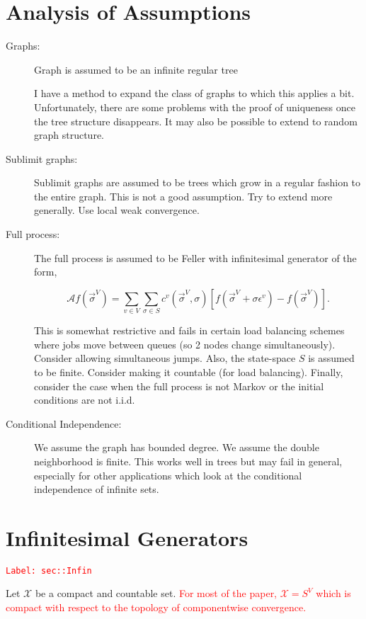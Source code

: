 \documentclass[12pt]{article}
\newcommand{\mc}{\mathcal}
\newcommand{\ep}{\epsilon}
\newcommand{\tr}{\textcolor{red}}
\newcommand{\labe}[1]{\tr{\texttt{Label: #1}}}
\renewcommand{\v}{v}							%
\renewcommand{\S}{S}							%
\newcommand{\s}{\sigma}							%
\newcommand{\sv}{\vec{\s}}						%
\newcommand{\ev}{\ep}							%
\newcommand{\IG}{\mc{A}}						%
\newcommand{\IGr}{c}							%
\newcommand{\vind}[1]{^{#1}}					%
\newcommand{\carp}[1]{^{#1}}					%
\newcommand{\vsi}[1]{^{#1}}						%
\newcommand{\spce}{\mc{X}}						%
\begin{document}
\section{Analysis of Assumptions}

\begin{description}
\item[Graphs: ] Graph is assumed to be an infinite regular tree

I have a method to expand the class of graphs to which this applies a bit. Unfortunately, there are some problems with the proof of uniqueness once the tree structure disappears. It may also be possible to extend to random graph structure.

\item[Sublimit graphs: ] Sublimit graphs are assumed to be trees which grow in a regular fashion to the entire graph. This is not a good assumption. Try to extend more generally. Use local weak convergence.

\item[Full process: ] The full process is assumed to be Feller with infinitesimal generator of the form,

\[\IG f(\sv\vsi{V}) = \sum_{\v \in V}\sum_{\s \in \S} \IGr\vind{\v}(\sv\vsi{V},\s)[f(\sv\vsi{V} + \s \ev\vind{\v}) - f(\sv\vsi{V})].\]

This is somewhat restrictive and fails in certain load balancing schemes where jobs move between queues (so 2 nodes change simultaneously). Consider allowing simultaneous jumps. Also, the state-space \(\S\) is assumed to be finite. Consider making it countable (for load balancing). Finally, consider the case when the full process is not Markov or the initial conditions are not i.i.d.

\item[Conditional Independence: ] We assume the graph has bounded degree. We assume the double neighborhood is finite. This works well in trees but may fail in general, especially for other applications which look at the conditional independence of infinite sets.
\end{description}

\newpage
\appendix

\section{Infinitesimal Generators}
\label{sec::Infin}\labe{sec::Infin}

Let \(\spce\) be a compact and countable set. \tr{For most of the paper, \(\spce = \S\carp{V}\) which is compact with respect to the topology of componentwise convergence.}
\end{document}
